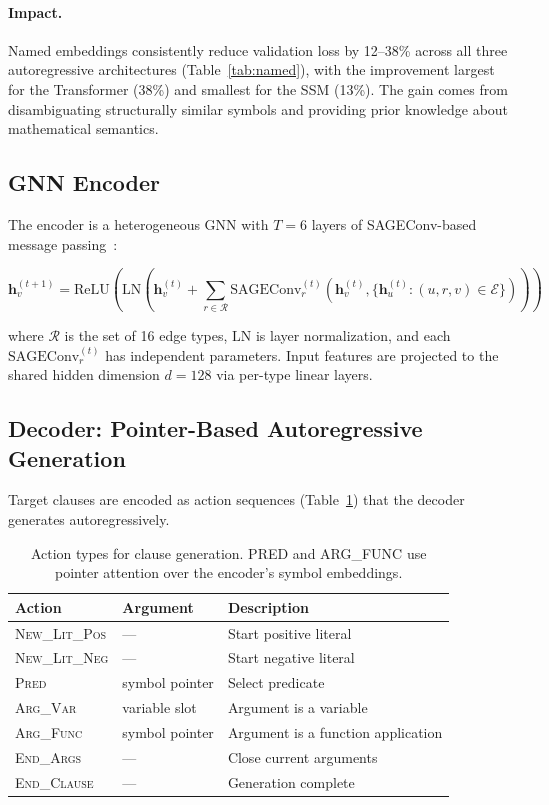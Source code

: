 \documentclass{article}
\begin{document}
\paragraph{Impact.}
Named embeddings consistently reduce validation loss by 12--38\% across all three
autoregressive architectures (Table~\ref{tab:named}), with the improvement largest
for the Transformer (38\%) and smallest for the SSM (13\%). The gain comes from
disambiguating structurally similar symbols and providing prior knowledge about
mathematical semantics.

\subsection{GNN Encoder}
\label{sec:encoder}

The encoder is a heterogeneous GNN with $T{=}6$ layers of SAGEConv-based message
passing~\cite{hamilton2017inductive}:

\begin{equation}
\mathbf{h}_v^{(t+1)} = \text{ReLU}\!\left(\text{LN}\!\left(
    \mathbf{h}_v^{(t)} + \sum_{r \in \mathcal{R}} \text{SAGEConv}_r^{(t)}\!\left(
    \mathbf{h}_v^{(t)}, \{\mathbf{h}_u^{(t)} : (u,r,v) \in \mathcal{E}\}\right)
\right)\right)
\end{equation}

where $\mathcal{R}$ is the set of 16 edge types, $\text{LN}$ is layer normalization,
and each $\text{SAGEConv}_r^{(t)}$ has independent parameters. Input features are
projected to the shared hidden dimension $d{=}128$ via per-type linear layers.

\subsection{Decoder: Pointer-Based Autoregressive Generation}
\label{sec:decoder}

Target clauses are encoded as action sequences (Table~\ref{tab:actions}) that the
decoder generates autoregressively.

\begin{table}[t]
\centering
\caption{Action types for clause generation. PRED and ARG\_FUNC use pointer
attention over the encoder's symbol embeddings.}
\label{tab:actions}
\begin{tabular}{lll}
\toprule
\textbf{Action} & \textbf{Argument} & \textbf{Description} \\
\midrule
\textsc{New\_Lit\_Pos} & --- & Start positive literal \\
\textsc{New\_Lit\_Neg} & --- & Start negative literal \\
\textsc{Pred} & symbol pointer & Select predicate \\
\textsc{Arg\_Var} & variable slot & Argument is a variable \\
\textsc{Arg\_Func} & symbol pointer & Argument is a function application \\
\textsc{End\_Args} & --- & Close current arguments \\
\textsc{End\_Clause} & --- & Generation complete \\
\bottomrule
\end{tabular}
\end{table}
\end{document}
